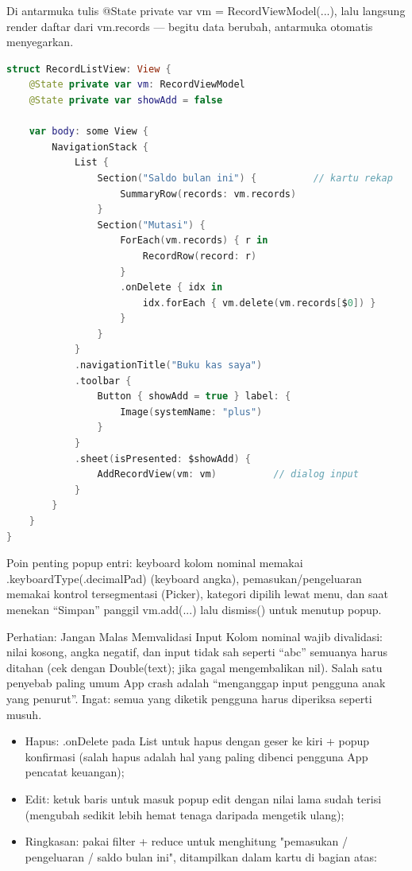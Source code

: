 Di antarmuka tulis @State private var vm = RecordViewModel(...), lalu langsung render daftar dari vm.records — begitu data berubah, antarmuka otomatis menyegarkan.


\begin{lstlisting}[language=Swift]
struct RecordListView: View {
    @State private var vm: RecordViewModel
    @State private var showAdd = false

    var body: some View {
        NavigationStack {
            List {
                Section("Saldo bulan ini") {          // kartu rekap
                    SummaryRow(records: vm.records)
                }
                Section("Mutasi") {
                    ForEach(vm.records) { r in
                        RecordRow(record: r)
                    }
                    .onDelete { idx in
                        idx.forEach { vm.delete(vm.records[$0]) }
                    }
                }
            }
            .navigationTitle("Buku kas saya")
            .toolbar {
                Button { showAdd = true } label: {
                    Image(systemName: "plus")
                }
            }
            .sheet(isPresented: $showAdd) {
                AddRecordView(vm: vm)          // dialog input
            }
        }
    }
}
\end{lstlisting}

Poin penting popup entri: keyboard kolom nominal memakai .keyboardType(.decimalPad) (keyboard angka), pemasukan/pengeluaran memakai kontrol tersegmentasi (Picker), kategori dipilih lewat menu, dan saat menekan “Simpan” panggil vm.add(...) lalu dismiss() untuk menutup popup.

\begin{tcbwarn}{Perhatian: Jangan Malas Memvalidasi Input}
Kolom nominal wajib divalidasi: nilai kosong, angka negatif, dan input tidak sah seperti “abc” semuanya harus ditahan (cek dengan Double(text); jika gagal mengembalikan nil). Salah satu penyebab paling umum App crash adalah “menganggap input pengguna anak yang penurut”. Ingat: semua yang diketik pengguna harus diperiksa seperti musuh.

\end{tcbwarn}


\begin{itemize}
  \item Hapus: .onDelete pada List untuk hapus dengan geser ke kiri + popup konfirmasi (salah hapus adalah hal yang paling dibenci pengguna App pencatat keuangan);
  \item Edit: ketuk baris untuk masuk popup edit dengan nilai lama sudah terisi (mengubah sedikit lebih hemat tenaga daripada mengetik ulang);
  \item Ringkasan: pakai filter + reduce untuk menghitung "pemasukan / pengeluaran / saldo bulan ini", ditampilkan dalam kartu di bagian atas:
\end{itemize}

